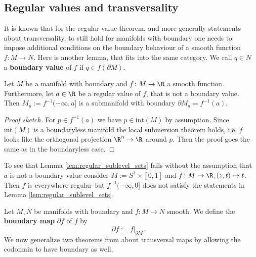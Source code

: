 \subsection{Regular values and transversality}
    It is known that for the regular value theorem, and more generally statements about transversality, to still hold for manifolds with boundary one needs to impose additional conditions on the boundary behaviour of a smooth function $f \colon M \to N$. Here is another lemma, that fits into the same category. We call $q \in N$ a \textbf{boundary value} of $f$ if $q \in f(\partial M)$.

    \begin{lemma}
        \label{lem:regular_sublevel_sets}
        Let $M$ be a manifold with boundary and $f \colon M \to \R$ a smooth function. Furthermore, let $a \in \R$ be a regular value of $f$, that is not a boundary value. Then $M_a := f^{-1}(-\infty,a]$ is a submanifold with boundary $\partial M_a = f^{-1}(a)$.
    \end{lemma}
    \begin{proof}[Proof sketch]
        For $p \in f^{-1}(a)$ we have $p \in \mathrm{int}(M)$ by assumption. Since $\mathrm{int}(M)$ is a boundaryless manifold the local submersion theorem holds, i.e. $f$ looks like the orthogonal projection $\R^n \to \R$ around $p$. Then the proof goes the same as in the boundaryless case.
    \end{proof}

    \begin{counterexample}
        \label{ex:boundary_values}
        To see that Lemma \ref{lem:regular_sublevel_sets} fails without the assumption that $a$ is not a boundary value consider $M := S^1 \times [0,1]$ and $f \colon M \to \R, (z,t) \mapsto t$. Then $f$ is everywhere regular but $f^{-1}(-\infty,0]$ does not satisfy the statements in Lemma \ref{lem:regular_sublevel_sets}. 
    \end{counterexample}

    Let $M,N$ be manifolds with boundary and $f \colon M\to N$ smooth. We define the \textbf{boundary map} $\partial f$ of $f$ by 
    \[
    \partial f := f|_{\partial M}.
    \]
    We now generalize two theorems from \cite{guillemin2010differential} about transversal maps by allowing the codomain to have boundary as well. 

